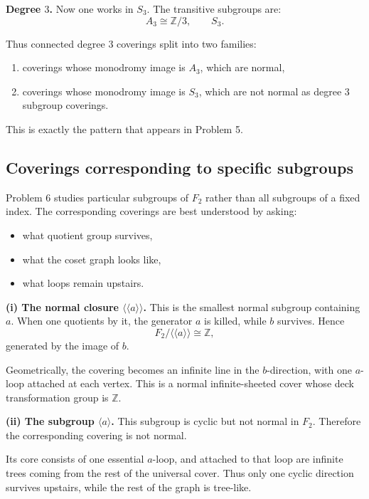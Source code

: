 \documentclass[12pt,a4paper]{article}
\theoremstyle{notespace}
\begin{document}
\medskip

\textbf{Degree \(3\).}
Now one works in \(S_3\). The transitive subgroups are:
\[
A_3\cong \mathbb Z/3,
\qquad
S_3.
\]

Thus connected degree \(3\) coverings split into two families:
\begin{enumerate}
	\item coverings whose monodromy image is \(A_3\), which are normal,
	\item coverings whose monodromy image is \(S_3\), which are not normal as degree \(3\) subgroup coverings.
\end{enumerate}

This is exactly the pattern that appears in Problem 5.

\bigskip

\subsection{ Coverings corresponding to specific subgroups}

Problem 6 studies particular subgroups of \(F_2\) rather than all subgroups of a fixed index. The corresponding coverings are best understood by asking:
\begin{itemize}
	\item what quotient group survives,
	\item what the coset graph looks like,
	\item what loops remain upstairs.
\end{itemize}

\medskip

\textbf{(i) The normal closure \(\langle\!\langle a\rangle\!\rangle\).}
This is the smallest normal subgroup containing \(a\). When one quotients by it, the generator \(a\) is killed, while \(b\) survives. Hence
\[
F_2/\langle\!\langle a\rangle\!\rangle \cong \mathbb Z,
\]
generated by the image of \(b\).

Geometrically, the covering becomes an infinite line in the \(b\)-direction, with one \(a\)-loop attached at each vertex. This is a normal infinite-sheeted cover whose deck transformation group is \(\mathbb Z\).

\medskip

\textbf{(ii) The subgroup \(\langle a\rangle\).}
This subgroup is cyclic but not normal in \(F_2\). Therefore the corresponding covering is not normal.

Its core consists of one essential \(a\)-loop, and attached to that loop are infinite trees coming from the rest of the universal cover. Thus only one cyclic direction survives upstairs, while the rest of the graph is tree-like.
\end{document}
